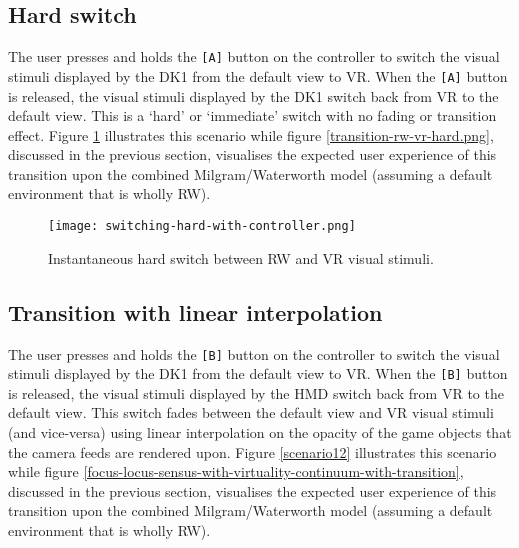 
\subsection{Hard switch}
\label{sub-hardswitch}
The user presses and holds the \texttt{[A]} button on the controller to switch the visual stimuli displayed by the DK1 from the default view to VR. When the \texttt{[A]} button is released, the visual stimuli displayed by the DK1 switch back from VR to the default view. This is a `hard' or `immediate' switch with no fading or transition effect. Figure \ref{scenario1} illustrates this scenario while figure \ref{transition-rw-vr-hard.png}, discussed in the previous section, visualises the expected user experience of this transition upon the combined Milgram/Waterworth model (assuming a default environment that is wholly RW).

\begin{figure}[h]
	\begin{center}
		\texttt{[image: switching-hard-with-controller.png]}
		\caption{Instantaneous hard switch between RW and VR visual stimuli.}
		\label{scenario1}
	\end{center}
\end{figure}


\subsection{Transition with linear interpolation}
\label{transition-with-linear-interpolation}
The user presses and holds the \texttt{[B]} button on the controller to switch the visual stimuli displayed by the DK1 from the default view to VR. When the \texttt{[B]} button is released, the visual stimuli displayed by the HMD switch back from VR to the default view. This switch fades between the default view and VR visual stimuli (and vice-versa) using linear interpolation on the opacity of the game objects that the camera feeds are rendered upon. Figure \ref{scenario12} illustrates this scenario while figure \ref{focus-locus-sensus-with-virtuality-continuum-with-transition}, discussed in the previous section, visualises the expected user experience of this transition upon the combined Milgram/Waterworth model (assuming a default environment that is wholly RW).


